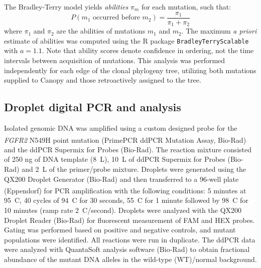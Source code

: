 The Bradley-Terry model yields \emph{abilities} $\pi_m$ for each mutation, such that:
\begin{equation}
	P(m_1 \text{ occurred before } m_2) = \frac{\pi_1}{\pi_1 + \pi_2}
\end{equation}
where $\pi_1$ and $\pi_2$ are the abilities of mutations $m_1$ and $m_2$. The maximum \textit{a priori} estimate of abilities \cite{btbayesian} was computed using the R package \texttt{BradleyTerryScalable} \cite{btscalable} with $a = 1.1$. Note that ability scores denote confidence in ordering, not the time intervals between acquisition of mutations. This analysis was performed independently for each edge of the clonal phylogeny tree, utilizing both mutations supplied to Canopy and those retroactively assigned to the tree.

\subsection{Droplet digital PCR and analysis}
Isolated genomic DNA was amplified using a custom designed probe for the \textit{FGFR2} N549H point mutation (PrimePCR ddPCR Mutation Assay, Bio-Rad\textsuperscript\textregistered{}) and the ddPCR Supermix for Probes (Bio-Rad). The reaction mixture consisted of 250 ng of DNA template (8~\textmu{}L), 10~\textmu{}L of ddPCR Supermix for Probes (Bio-Rad) and 2~\textmu{}L of the primer/probe mixture. Droplets were generated using the QX200 Droplet Generator (Bio-Rad) and then transferred to a 96-well plate (Eppendorf\textsuperscript\textregistered{}) for PCR amplification with the following conditions: 5 minutes at 95~\textdegree{}C, 40 cycles of 94~\textdegree{}C for 30 seconds, 55~\textdegree{}C for 1 minute followed by 98~\textdegree{}C for 10 minutes (ramp rate 2~\textdegree{}C/second). Droplets were analyzed with the QX200 Droplet Reader (Bio-Rad) for fluorescent measurement of FAM and HEX probes. Gating was performed based on positive and negative controls, and mutant populations were identified. All reactions were run in duplicate. The ddPCR data were analyzed with QuantaSoft analysis software (Bio-Rad) to obtain fractional abundance of the mutant DNA alleles in the wild-type (WT)/normal background.

